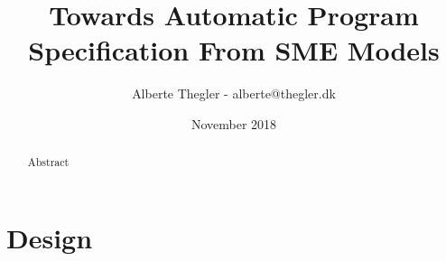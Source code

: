 \documentclass[a4paper]{report}
\title{Towards Automatic Program Specification From SME Models}
\author{Alberte Thegler - alberte@thegler.dk}
\date{November 2018}
\begin{document}
\maketitle

\begin{abstract}
\begin{doublespace}
Abstract

\end{doublespace}
\end{abstract}



\newpage
\tableofcontents
%
%
\newpage
{}


% 
% 
% 
% 
% 
% 
% 
% 

% 
%
%
% 
%
% 
%
% 
%
% 
%
\chapter{Design}

\end{document}

